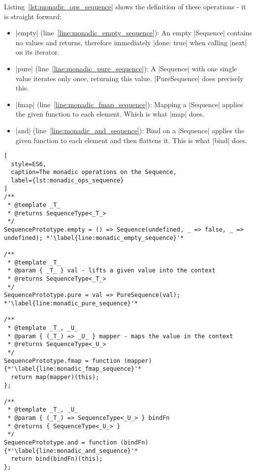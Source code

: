 Listing~\ref{lst:monadic_ops_sequence} shows the definition of these
operations - it is straight forward:
\begin{itemize}
  \item |empty| (line~\ref{line:monadic_empty_sequence}): An empty |Sequence|
    contains no values and returns, therefore immediately |done: true| when
    calling |next| on its iterator.
  \item |pure| (line~\ref{line:monadic_pure_sequence}): A |Sequence| with one
    single value iterates only once, returning this value. |PureSequence| does
    precisely this.
  \item |fmap| (line~\ref{line:monadic_fmap_sequence}): Mapping a |Sequence|
    applies the given function to each element. Which is what |map| does.
  \item |and| (line~\ref{line:monadic_and_sequence}): Bind on a |Sequence|
    applies the given function to each element and then flattens it. This is
    what |bind| does.
\end{itemize}

\begin{lstlisting}[
  style=ES6,
  caption=The monadic operations on the Sequence,
  label={lst:monadic_ops_sequence}
]
/**
 * @template _T_
 * @returns SequenceType<_T_>
 */
SequencePrototype.empty = () => Sequence(undefined, _ => false, _ => undefined); *'\label{line:monadic_empty_sequence}'*

/**
 * @template _T_
 * @param { _T_ } val - lifts a given value into the context
 * @returns SequenceType<_T_>
 */
SequencePrototype.pure = val => PureSequence(val); *'\label{line:monadic_pure_sequence}'*

/**
 * @template _T_, _U_
 * @param { (_T_) => _U_ } mapper - maps the value in the context
 * @returns SequenceType<_U_>
 */
SequencePrototype.fmap = function (mapper) {*'\label{line:monadic_fmap_sequence}'*
  return map(mapper)(this); 
};

/**
 * @template _T_, _U_
 * @param { (_T_) => SequenceType<_U_> } bindFn
 * @returns { SequenceType<_U_> }
 */
SequencePrototype.and = function (bindFn) {*'\label{line:monadic_and_sequence}'*
  return bind(bindFn)(this); 
};

\end{lstlisting}


